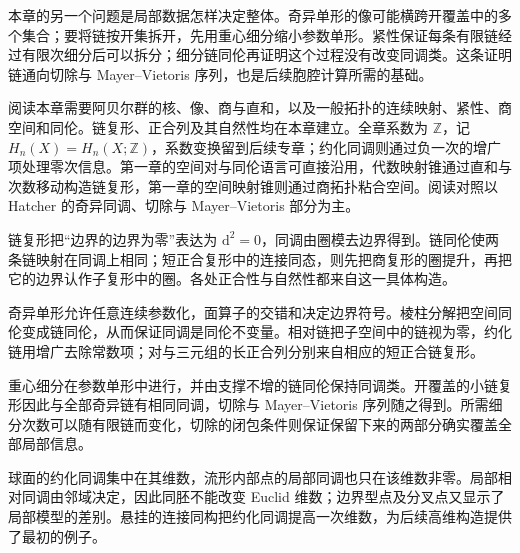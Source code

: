 \ProseParagraphBreak

本章的另一个问题是局部数据怎样决定整体。奇异单形的像可能横跨开覆盖中的多个集合；要将链按开集拆开，先用重心细分缩小参数单形。紧性保证每条有限链经过有限次细分后可以拆分；细分链同伦再证明这个过程没有改变同调类。这条证明链通向切除与 Mayer–Vietoris 序列，也是后续胞腔计算所需的基础。

\ProseParagraphBreak

阅读本章需要阿贝尔群的核、像、商与直和，以及一般拓扑的连续映射、紧性、商空间和同伦。链复形、正合列及其自然性均在本章建立。全章系数为 \(\mathbb Z\)，记 \(H_n(X)=H_n(X;\mathbb Z)\)，系数变换留到后续专章；约化同调则通过负一次的增广项处理零次信息。第一章的空间对与同伦语言可直接沿用，代数映射锥通过直和与次数移动构造链复形，第一章的空间映射锥则通过商拓扑粘合空间。阅读对照以 Hatcher 的奇异同调、切除与 Mayer–Vietoris 部分为主\cite[第2.1节；第2.2节]{Hatcher2002}。






\begin{chaptersummary}
	链复形把“边界的边界为零”表达为 \(\mathrm{d}^2=0\)，同调由圈模去边界得到。链同伦使两条链映射在同调上相同；短正合复形中的连接同态，则先把商复形的圈提升，再把它的边界认作子复形中的圈。各处正合性与自然性都来自这一具体构造。

	\ProseParagraphBreak

	奇异单形允许任意连续参数化，面算子的交错和决定边界符号。棱柱分解把空间同伦变成链同伦，从而保证同调是同伦不变量。相对链把子空间中的链视为零，约化链用增广去除常数项；对与三元组的长正合列分别来自相应的短正合链复形。

	\ProseParagraphBreak

	重心细分在参数单形中进行，并由支撑不增的链同伦保持同调类。开覆盖的小链复形因此与全部奇异链有相同同调，切除与 Mayer–Vietoris 序列随之得到。所需细分次数可以随有限链而变化，切除的闭包条件则保证保留下来的两部分确实覆盖全部局部信息。

	\ProseParagraphBreak

	球面的约化同调集中在其维数，流形内部点的局部同调也只在该维数非零。局部相对同调由邻域决定，因此同胚不能改变 Euclid 维数；边界型点及分叉点又显示了局部模型的差别。悬挂的连接同构把约化同调提高一次维数，为后续高维构造提供了最初的例子。
\end{chaptersummary}

\BookExercises

